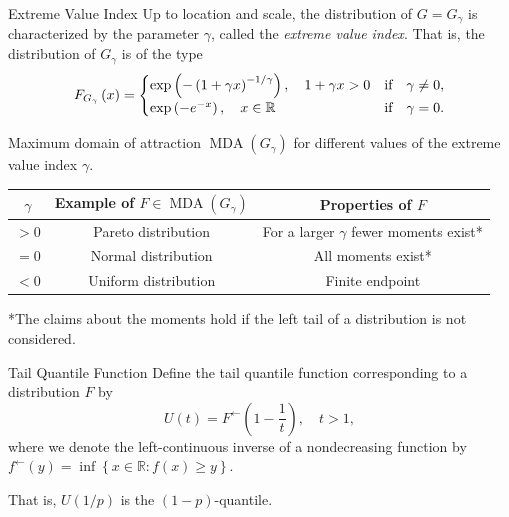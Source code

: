 \documentclass{beamer}
\DeclareMathOperator{\mda}{MDA}
\begin{document}

\begin{frame}{Extreme Value Index \parencite{fisher1928,gnedenko1943}}
  Up to location and scale, the distribution of $G = G_\gamma$ is characterized
  by the parameter $\gamma$, called the \emph{extreme value index}. That is, the
  distribution of ${G_\gamma}$ is of the type
  \begin{equation*}
    F_{G_\gamma}\left(x\right) =
    \begin{cases}
      \exp\left(-\left(1 + \gamma x\right)^{-1/\gamma}\right),
      \quad 1 + \gamma x > 0 &\textnormal{if}\quad \gamma\neq 0, \\
      \exp\left(-e^{-x}\right),
      \quad x\in\mathbb{R} &\textnormal{if}\quad \gamma = 0.
    \end{cases}
  \end{equation*}
\end{frame}


\begin{frame}
  Maximum domain of attraction $\mda\left(G_\gamma\right)$ for different values
  of the extreme value index $\gamma$.
  \begin{table}
    \small
    \centering
    \begin{tabular}{c|c|c}
      $\gamma$ & Example of $F\in\mda\left(G_\gamma\right)$ & Properties of $F$
      \\
      \hline\hline
      $> 0$ & Pareto distribution & For a larger $\gamma$ fewer moments exist*
      \\
      $= 0$ & Normal distribution & All moments exist* \\
      $< 0$ & Uniform distribution & Finite endpoint
    \end{tabular}
  \end{table}
  *The claims about the moments hold if the left tail of a distribution is not
  considered.
\end{frame}


\begin{frame}{Tail Quantile Function}
  Define the tail quantile function corresponding to a distribution $F$ by
  \begin{equation*}
    U\left(t\right) = F^{\leftarrow}\left(1 - \frac{1}{t}\right), \quad t > 1,
  \end{equation*}
  where we denote the left-continuous inverse of a nondecreasing function by
  $f^\leftarrow\left(y\right) = \inf\left\{x\in\mathbb{R} : f(x) \geq
  y\right\}$.
  \vspace*{0.5cm}
  \pause

  That is, $U\left(1/p\right)$ is the $(1-p)$-quantile.
\end{frame}
\end{document}
